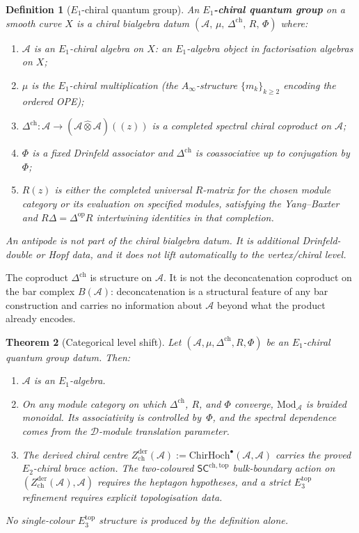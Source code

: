 \documentclass[11pt]{article}
\newtheorem{theorem}{Theorem}[section]
\newtheorem{definition}[theorem]{Definition}
\theoremstyle{remark}
\providecommand{\cA}{\mathcal{A}}
\providecommand{\cD}{\mathcal{D}}
\providecommand{\Mod}{\mathrm{Mod}}
\providecommand{\ChirHoch}{\mathrm{ChirHoch}}
\providecommand{\op}{\mathrm{op}}
\providecommand{\Ainf}{A_\infty}
\providecommand{\SCchtop}{\mathsf{SC}^{\mathrm{ch},\mathrm{top}}}
\begin{document}
\begin{definition}[$E_1$-chiral quantum group]%
\label{def:e1-chiral-qg}%
An \textbf{$E_1$-chiral quantum group} on a smooth curve $X$ is a
chiral bialgebra datum
$(\cA,\, \mu,\, \Delta^{\mathrm{ch}},\, R,\, \Phi)$ where:
\begin{enumerate}[label=(\roman*)]
\item $\cA$ is an $E_1$-chiral algebra on $X$: an $E_1$-algebra object in
  factorisation algebras on $X$;
\item $\mu$ is the $E_1$-chiral multiplication (the $\Ainf$-structure
  $\{m_k\}_{k \ge 2}$ encoding the ordered OPE);
\item $\Delta^{\mathrm{ch}} \colon
  \cA \to (\cA \widehat{\otimes}\cA)((z))$ is a completed spectral
  chiral coproduct on $\cA$;
\item $\Phi$ is a fixed Drinfeld associator and
  $\Delta^{\mathrm{ch}}$ is coassociative up to conjugation by~$\Phi$;
\item $R(z)$ is either the completed universal $R$-matrix for the chosen
  module category or its evaluation on specified modules, satisfying the
  Yang--Baxter and $R\Delta=\Delta^{\op}R$ intertwining identities in
  that completion.
\end{enumerate}
An antipode is not part of the chiral bialgebra datum.  It is additional
Drinfeld-double or Hopf data, and it does not lift automatically to the
vertex/chiral level.
\end{definition}

The coproduct $\Delta^{\mathrm{ch}}$ is structure on $\cA$.  It is not the
deconcatenation coproduct on the bar complex $B(\cA)$:
deconcatenation is a structural feature of any bar construction
and carries no information about $\cA$ beyond what the product
already encodes.

\begin{theorem}[Categorical level shift]\label{thm:level-shift}
Let $(\cA,\mu,\Delta^{\mathrm{ch}},R,\Phi)$ be an $E_1$-chiral quantum
group datum.
Then:
\begin{enumerate}[label=\textup{(\alph*)}]
\item $\cA$ is an $E_1$-algebra.
\item On any module category on which $\Delta^{\mathrm{ch}}$, $R$, and
  $\Phi$ converge, $\Mod_\cA$ is braided monoidal.  Its associativity is
  controlled by~$\Phi$, and the spectral dependence comes from the
  $\cD$-module translation parameter.
\item The derived chiral centre $Z^{\mathrm{der}}_{\mathrm{ch}}(\cA)
  := \ChirHoch^\bullet(\cA, \cA)$ carries the proved $E_2$-chiral brace
  action.  The two-coloured $\SCchtop$ bulk-boundary action on
  $(Z^{\mathrm{der}}_{\mathrm{ch}}(\cA),\cA)$ requires the heptagon
  hypotheses, and a strict $E_3^{\mathrm{top}}$ refinement requires
  explicit topologisation data.
\end{enumerate}
No single-colour $E_3^{\mathrm{top}}$ structure is produced by the
definition alone.
\end{theorem}
\end{document}
